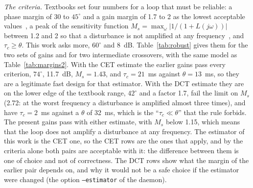 \emph{The criteria.} Textbooks set four numbers for a loop that must be reliable: a phase margin of 30 to $45^{\circ}$ and a gain margin of 1.7 to 2 as the lowest acceptable values~\citep{seborg2017}, a peak of the sensitivity function $M_s = \max_{\omega} |1/(1 + L(j\omega))|$ between 1.2 and 2 so that a disturbance is not amplified at any frequency~\citep{astromhagglund2006}, and $\tau_c \geq \theta$. This work asks more, $60^{\circ}$ and 8~dB. Table~\ref{tab:robust} gives them for the two sets of gains and for two intermediate crossovers, with the same model as Table~\ref{tab:margins2}. With the CET estimate the earlier gains pass every criterion, $74^{\circ}$, 11.7~dB, $M_s = 1.43$, and $\tau_c = 21$~ms against $\theta = 13$~ms, so they are a legitimate fast design for that estimator. With the DCT estimate they are on the lower edge of the textbook range, $42^{\circ}$ and a factor 1.7, fail the limit on $M_s$ (2.72: at the worst frequency a disturbance is amplified almost three times), and have $\tau_c = 2$~ms against a $\theta$ of 32~ms, which is the ``$\tau_c \ll \theta$'' that the rule forbids. The present gains pass with either estimate, with $M_s$ below 1.15, which means that the loop does not amplify a disturbance at any frequency. The estimator of this work is the CET one, so the CET rows are the ones that apply, and by the criteria alone both pairs are acceptable with it: the difference between them is one of choice and not of correctness. The DCT rows show what the margin of the earlier pair depends on, and why it would not be a safe choice if the estimator were changed (the option \texttt{--estimator} of the daemon).

